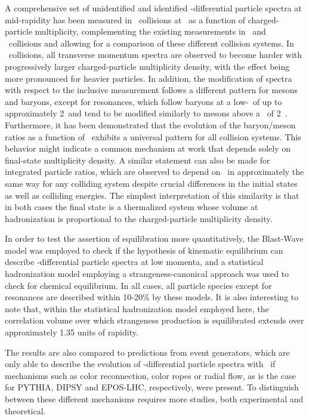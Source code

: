 \documentclass[ALICE,manyauthors]{cernphprep}
\begin{document}
A comprehensive set of unidentified and identified \pt-differential particle spectra at mid-rapidity has been measured in \pp\ collisions
 at \seven\ as a function of charged-particle multiplicity, complementing the existing measurements
in \pPb\ and \PbPb\ collisions and allowing for a comparison of these different collision systems. 
In \pp\ collisions, all transverse momentum spectra are observed to become harder with progressively 
larger charged-particle multiplicity density, with the effect being more pronounced for heavier particles. 
In addition, the modification of spectra with respect to the inclusive measurement follows a different
pattern for mesons and baryons, except for resonances, which follow baryons at a low-\pt\ of up to approximately 2~\gevc and tend to 
be modified similarly to mesons above a \pt\ of 2~\gevc. Furthermore, it has been 
demonstrated that the evolution of the baryon/meson ratios as a function of \avdNdeta\ exhibits
a universal pattern for all collision systems. This behavior might indicate a common mechanism at work that 
depends solely on final-state multiplicity density. A similar statement can 
also be made for integrated particle ratios, which are observed to depend on \avdNdeta\ in approximately the
same way for any colliding system despite crucial differences in the initial states as well as colliding 
energies. The simplest interpretation of this similarity is that in both cases the final state is a thermalized 
system whose volume at hadronization is proportional to the charged-particle multiplicity density. 

In order to test the assertion of equilibration more quantitatively, the Blast-Wave model was employed to check if the 
hypothesis of kinematic equilibrium can describe \pt-differential particle spectra at low momenta, and a statistical hadronization model 
employing a strangeness-canonical approach was used to check for chemical equilibrium. In all cases, all particle 
species except for resonances are 
described within 10-20\% by these models. It is also interesting to note that, within the
statistical hadronization model employed here, the correlation volume over which 
strangeness production is equilibrated extends over approximately 1.35 units of rapidity.

The results are also compared to predictions from event generators, which are only able to describe the
evolution of \pt-differential particle spectra with \avdNdeta\ if mechanisms such as color reconnection, color ropes or radial flow, as is the
case for PYTHIA, DIPSY and EPOS-LHC, respectively, were present. 
To distinguish between these different mechanisms requires more studies, both experimental and theoretical.
\end{document}
